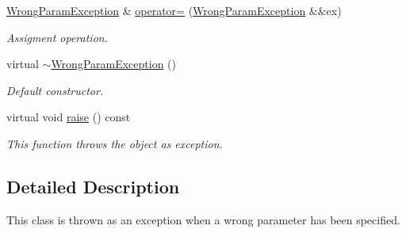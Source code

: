 \begin{DoxyCompactItemize}
\hyperlink{class_dynamic_fast_buffers_1_1_wrong_param_exception}{Wrong\-Param\-Exception} \& \hyperlink{class_dynamic_fast_buffers_1_1_wrong_param_exception_a53f2348fbf2b61ec5efa94864094d266}{operator=} (\hyperlink{class_dynamic_fast_buffers_1_1_wrong_param_exception}{Wrong\-Param\-Exception} \&\&ex)
\begin{DoxyCompactList}\small\item\em Assigment operation. \end{DoxyCompactList}\item 
\hypertarget{class_dynamic_fast_buffers_1_1_wrong_param_exception_a9d7a7331981b552d18456320c5e3b3e1}{virtual \hyperlink{class_dynamic_fast_buffers_1_1_wrong_param_exception_a9d7a7331981b552d18456320c5e3b3e1}{$\sim$\-Wrong\-Param\-Exception} ()}\label{class_dynamic_fast_buffers_1_1_wrong_param_exception_a9d7a7331981b552d18456320c5e3b3e1}

\begin{DoxyCompactList}\small\item\em Default constructor. \end{DoxyCompactList}\item 
\hypertarget{class_dynamic_fast_buffers_1_1_wrong_param_exception_a6cfaa9d21b54b14aba02a45381168782}{virtual void \hyperlink{class_dynamic_fast_buffers_1_1_wrong_param_exception_a6cfaa9d21b54b14aba02a45381168782}{raise} () const }\label{class_dynamic_fast_buffers_1_1_wrong_param_exception_a6cfaa9d21b54b14aba02a45381168782}

\begin{DoxyCompactList}\small\item\em This function throws the object as exception. \end{DoxyCompactList}\end{DoxyCompactItemize}


\subsection{Detailed Description}
This class is thrown as an exception when a wrong parameter has been specified. 

